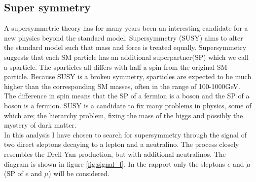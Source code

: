 \documentclass{article}
\begin{document}
\subsection{Super symmetry}\label{sec:SUSY}
A supersymmetric theory has for many years been an interesting candidate for a new physics beyond the standard model. Supersymmetry (SUSY) aims to alter the standard model such that mass and force is treated equally. Supersymmetry suggests that each SM particle has an additional superpartner(SP) which we call a sparticle. The sparticles all differs with half a spin from the original SM particle. Because SUSY is a broken symmetry, sparticles are expected to be much higher than the corresponding SM masses, often in the range of 100-1000GeV. The difference in spin means that the SP of a fermion is a boson and the SP of a boson is a fermion. SUSY is a candidate to fix many problems in physics, some of which are; the hierarchy problem, fixing the mass of the higgs and possibly the mystery of dark matter.
\\
In this analysis I have chosen to search for supersymmetry through the signal of two direct sleptons decaying to a lepton and a neutralino. The process closely resembles the Drell-Yan production, but with additional neutralinos. The diagram is shown in figure \ref{fig:signal_f}. In the rapport only the sleptons $\tilde{e}$ and $\tilde{\mu}$ (SP of ${e}$ and ${\mu}$) will be considered.
\\
\end{document}
